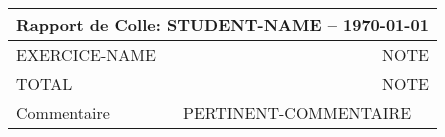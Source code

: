 \documentclass{article}
\begin{document}
\begin{tabular}{|c|p{7cm}p{1pt}|}
    \hline
    \multicolumn{3}{|c|}{Rapport de Colle: \textbf{ STUDENT-NAME} -- \today} \\
    \hline\hline
    \multicolumn{2}{|l|}{EXERCICE-NAME} & \multicolumn{1}{r|}{NOTE} \\ 
    \hline
    \multicolumn{2}{|l|}{TOTAL} & \multicolumn{1}{r|}{NOTE} \\ 
    \hline
    \multicolumn{2}{|l|}{Commentaire} & \multicolumn{1}{|p{8cm}|}{PERTINENT-COMMENTAIRE}  \\
    \hline
\end{tabular}
\end{document}
